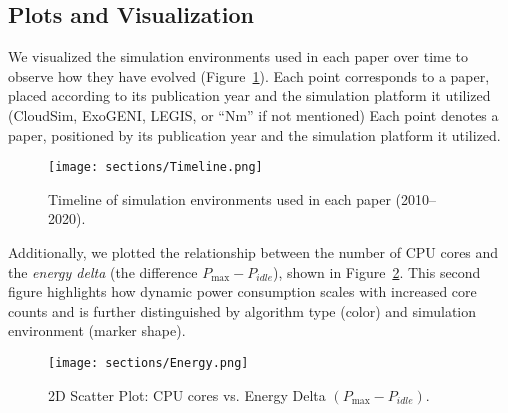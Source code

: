 \begin{multicols}{2}

\subsection{Plots and Visualization}

We visualized the simulation environments used in each paper over time to observe how they have evolved (Figure~\ref{fig:timeline}). Each point corresponds to a paper, placed according to its publication year and the simulation platform it utilized (CloudSim, ExoGENI, LEGIS, or ``Nm'' if not mentioned) Each point denotes a paper, positioned by its publication year and the simulation platform it utilized.

\begin{figure}[H]
    \centering
    \texttt{[image: sections/Timeline.png]}
    \caption{Timeline of simulation environments used in each paper (2010--2020). }
    \label{fig:timeline}
\end{figure}

Additionally, we plotted the relationship between the number of CPU cores and the \textit{energy delta} (the difference $P_{\max} - P_{\textit{idle}}$), shown in Figure~\ref{fig:energy_delta}. This second figure highlights how dynamic power consumption scales with increased core counts and is further distinguished by algorithm type (color) and simulation environment (marker shape).

\end{multicols}
\begin{figure}[H]
    \centering
    \texttt{[image: sections/Energy.png]}
    \caption{2D Scatter Plot: CPU cores vs. Energy Delta $(P_{\max} - P_{\textit{idle}})$.}
    \label{fig:energy_delta}
\end{figure}
\begin{multicols}{2}

\end{multicols}
